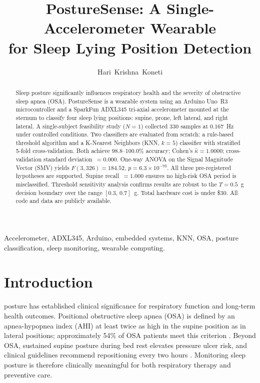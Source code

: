 \documentclass[journal]{IEEEtran}
\begin{document}
\title{PostureSense: A Single-Accelerometer Wearable\\
for Sleep Lying Position Detection}

\author{Hari~Krishna~Koneti}

\maketitle

\begin{abstract}
Sleep posture significantly influences respiratory health and the severity
of obstructive sleep apnea (OSA). PostureSense is a wearable system using
an Arduino Uno~R3 microcontroller and a SparkFun ADXL345 tri-axial
accelerometer mounted at the sternum to classify four sleep lying positions:
supine, prone, left lateral, and right lateral. A single-subject feasibility
study ($N=1$) collected 330 samples at 0.167~Hz under controlled conditions.
Two classifiers are evaluated from scratch: a rule-based threshold algorithm
and a K-Nearest Neighbors (KNN, $k=5$) classifier with stratified 5-fold
cross-validation. Both achieve 98.8--100.0\% accuracy; Cohen's
$\hat{\kappa}=1.0000$; cross-validation standard deviation~$=0.000$.
One-way ANOVA on the Signal Magnitude Vector (SMV) yields
$F(3,326)=184.52$, $p=6.3\times10^{-70}$. All three pre-registered
hypotheses are supported. Supine recall~$=1.000$ ensures no high-risk OSA
period is misclassified. Threshold sensitivity analysis confirms results are
robust to the $T=0.5$~g decision boundary over the range $[0.3,\,0.7]$~g.
Total hardware cost is under \$30. All code and data are publicly available.
\end{abstract}

\begin{IEEEkeywords}
Accelerometer, ADXL345, Arduino, embedded systems, KNN, OSA, posture
classification, sleep monitoring, wearable computing.
\end{IEEEkeywords}

\section{Introduction}

 posture has established clinical significance for
respiratory function and long-term health outcomes. Positional obstructive
sleep apnea (OSA) is defined by an apnea-hypopnea index (AHI) at least
twice as high in the supine position as in lateral positions;
approximately 54\% of OSA patients meet this criterion
\cite{skinner2008,mador2005}. Beyond OSA, sustained supine posture during
bed rest elevates pressure ulcer risk, and clinical guidelines recommend
repositioning every two hours \cite{npuap2019}. Monitoring sleep posture is
therefore clinically meaningful for both respiratory therapy and preventive
care.
\end{document}
